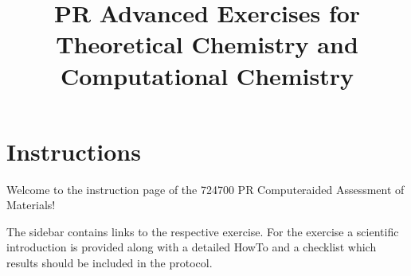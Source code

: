 \documentclass[
  letterpaper,
]{article}
\title{PR Advanced Exercises for Theoretical Chemistry and Computational Chemistry}
\author{}
\date{}
\renewcommand*\contentsname{Table of contents}
\newcommand\contentsname{Table of contents}
\begin{document}
\maketitle
\pagestyle{mystyle}

\ifdefined\Shaded\renewenvironment{Shaded}{\begin{tcolorbox}[colback={shadecolor}, frame hidden, boxrule=0pt, enhanced, breakable]}{\end{tcolorbox}}\fi

\renewcommand*\contentsname{Table of contents}
{
\hypersetup{linkcolor=}
\setcounter{tocdepth}{3}
\tableofcontents
}

\hypertarget{instructions}{%
\section{Instructions}\label{instructions}}

Welcome to the instruction page of the 724700 PR Computeraided
Assessment of Materials!

The sidebar contains links to the respective exercise. For the exercise
a scientific introduction is provided along with a detailed HowTo and a
checklist which results should be included in the protocol.
\end{document}

